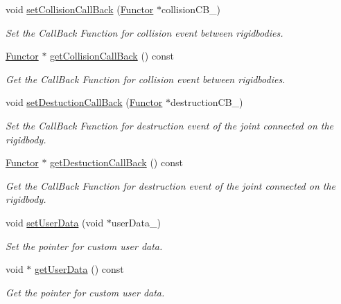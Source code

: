 \begin{DoxyCompactItemize}
void \hyperlink{class_i_dream_sky_1_1_physics3_1_1_vehicle_aee0d8a9a8a36a8efa73fbc2aca033b86}{set\+Collision\+Call\+Back} (\hyperlink{class_i_dream_sky_1_1_functor}{Functor} $\ast$collision\+C\+B\+\_\+)
\begin{DoxyCompactList}\small\item\em Set the Call\+Back Function for collision event between rigidbodies. \end{DoxyCompactList}\item 
\hyperlink{class_i_dream_sky_1_1_functor}{Functor} $\ast$ \hyperlink{class_i_dream_sky_1_1_physics3_1_1_vehicle_a8a549fce2c983f868730434c689c9175}{get\+Collision\+Call\+Back} () const 
\begin{DoxyCompactList}\small\item\em Get the Call\+Back Function for collision event between rigidbodies. \end{DoxyCompactList}\item 
void \hyperlink{class_i_dream_sky_1_1_physics3_1_1_vehicle_a43af46d1d8f79f557b00023313e977b6}{set\+Destuction\+Call\+Back} (\hyperlink{class_i_dream_sky_1_1_functor}{Functor} $\ast$destruction\+C\+B\+\_\+)
\begin{DoxyCompactList}\small\item\em Set the Call\+Back Function for destruction event of the joint connected on the rigidbody. \end{DoxyCompactList}\item 
\hyperlink{class_i_dream_sky_1_1_functor}{Functor} $\ast$ \hyperlink{class_i_dream_sky_1_1_physics3_1_1_vehicle_a2bf1c7764f321a534e297ce76aab5b2f}{get\+Destuction\+Call\+Back} () const 
\begin{DoxyCompactList}\small\item\em Get the Call\+Back Function for destruction event of the joint connected on the rigidbody. \end{DoxyCompactList}\item 
void \hyperlink{class_i_dream_sky_1_1_physics3_1_1_vehicle_a5800abfa02e61f0706f3101e04b79c39}{set\+User\+Data} (void $\ast$user\+Data\+\_\+)
\begin{DoxyCompactList}\small\item\em Set the pointer for custom user data. \end{DoxyCompactList}\item 
void $\ast$ \hyperlink{class_i_dream_sky_1_1_physics3_1_1_vehicle_a76893bc978d766d44c242b9579367afb}{get\+User\+Data} () const 
\begin{DoxyCompactList}\small\item\em Get the pointer for custom user data. \end{DoxyCompactList}\item 

\end{DoxyCompactItemize}
